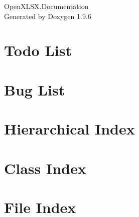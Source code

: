 \documentclass[twoside]{book}
\newcommand{\+}{\discretionary{\mbox{\scriptsize$\hookleftarrow$}}{}{}}
\newcommand{\clearemptydoublepage}{%
    \newpage{\pagestyle{empty}\cleardoublepage}%
  }
\begin{document}
  \raggedbottom
    \hypersetup{pageanchor=false,
                bookmarksnumbered=true,
                pdfencoding=unicode
               }
  \begin{titlepage}
  \vspace*{7cm}
  \begin{center}%
  {\Large Open\+XLSX.\+Documentation}\\
  \vspace*{1cm}
  {\large Generated by Doxygen 1.9.6}\\
  \end{center}
  \end{titlepage}
  \clearemptydoublepage
  \tableofcontents
  \clearemptydoublepage
  \hypersetup{pageanchor=true}
\chapter{Todo List}
\label{todo}

\chapter{Bug List}
\label{bug}

\chapter{Hierarchical Index}

\chapter{Class Index}

\chapter{File Index}

\end{document}
